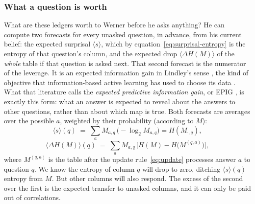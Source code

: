 \documentclass[11pt]{article}
\begin{document}
\subsubsection{What a question is worth}\label{sec:forecasts}

What are these ledgers worth to Werner before he asks anything? He can
compute two forecasts for every unasked question, in advance, from his
current belief: the expected
surprisal $\langle s \rangle$, which by
equation~\eqref{eq:surprisal-entropy} is the entropy of that
question's column, and the expected drop
$\langle \Delta H(M) \rangle$ of the \emph{whole} table if that
question is asked next. That second forecast is the numerator of the
leverage. It is an expected information gain in Lindley's sense
\cite{lindley56}, the kind of objective that information-based active
learning has used to choose its data \cite{mackay92}. What that
literature calls the \emph{expected predictive information gain}, or EPIG
\cite{bickfordsmith23}, is exactly this form: what an answer is expected
to reveal about the answers to other questions, rather than about which
map is true. Both forecasts are averages over the
possible $a$, weighted by their probability (according to $M$):
\begin{equation}
  \langle s \rangle(q)
  \;=\; \sum_{a} M_{a,q}\,\big({-}\log_2 M_{a,q}\big) = H(M_{\cdot,q}),
\end{equation}
\begin{equation}
  \langle \Delta H(M) \rangle(q)
  \;=\; \sum_{a} M_{a,q}\,\Big[H(M) - H\big(M^{(q,a)}\big)\Big],
\end{equation}
where $M^{(q,a)}$ is the table after the update
rule~\eqref{eq:update} processes answer $a$ to question $q$. We know the entropy of column $q$ will drop to zero, ditching $\langle s \rangle(q)$ entropy from $M$. But other columns will also respond.
The excess of the second over the first is
the expected transfer to unasked columns, and it can only be paid out
of correlations.
\end{document}
